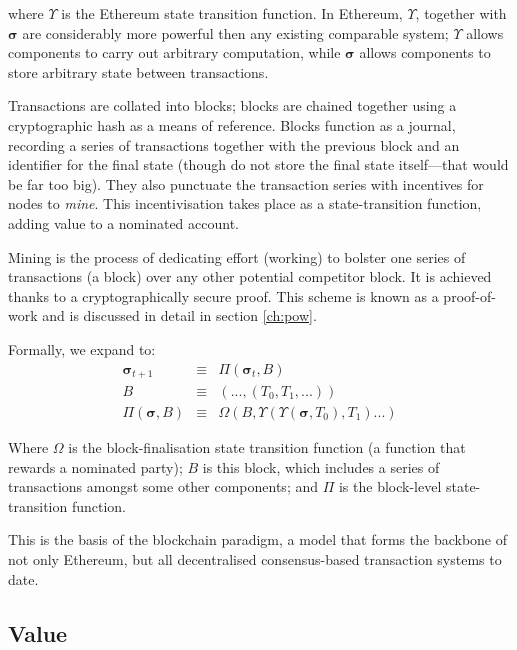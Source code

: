 \documentclass[9pt,oneside]{amsart}
\begin{document}
\begin{multicols}{2}
where $\Upsilon$ is the Ethereum state transition function. In Ethereum, $\Upsilon$, together with $\boldsymbol{\sigma}$ are considerably more powerful then any existing comparable system; $\Upsilon$ allows components to carry out arbitrary computation, while $\boldsymbol{\sigma}$ allows components to store arbitrary state between transactions.

Transactions are collated into blocks; blocks are chained together using a cryptographic hash as a means of reference. Blocks function as a journal, recording a series of transactions together with the previous block and an identifier for the final state (though do not store the final state itself---that would be far too big). They also punctuate the transaction series with incentives for nodes to \textit{mine}. This incentivisation takes place as a state-transition function, adding value to a nominated account.

Mining is the process of dedicating effort (working) to bolster one series of transactions (a block) over any other potential competitor block. It is achieved thanks to a cryptographically secure proof. This scheme is known as a proof-of-work and is discussed in detail in section \ref{ch:pow}.

Formally, we expand to:
\begin{eqnarray}
\boldsymbol{\sigma}_{t+1} & \equiv & \Pi(\boldsymbol{\sigma}_{t}, B) \\
B & \equiv & (..., (T_0, T_1, ...) ) \\
\Pi(\boldsymbol{\sigma}, B) & \equiv & \Omega(B, \Upsilon(\Upsilon(\boldsymbol{\sigma}, T_0), T_1) ...)
\end{eqnarray}

Where $\Omega$ is the block-finalisation state transition function (a function that rewards a nominated party); $B$ is this block, which includes a series of transactions amongst some other components; and $\Pi$ is the block-level state-transition function.

This is the basis of the blockchain paradigm, a model that forms the backbone of not only Ethereum, but all decentralised consensus-based transaction systems to date.

\subsection{Value}


\end{multicols}
\end{document}
